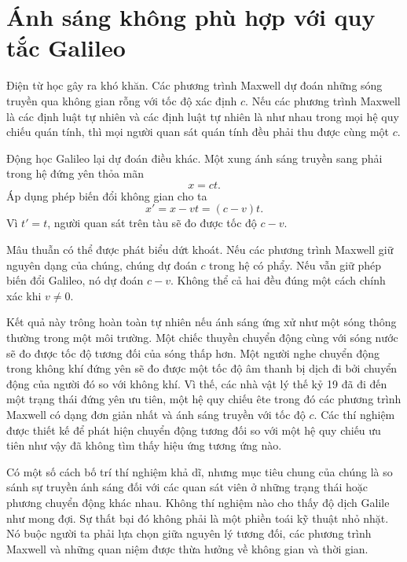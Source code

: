\section{Ánh sáng không phù hợp với quy tắc Galileo}

Điện từ học gây ra khó khăn. Các phương trình Maxwell dự đoán những sóng truyền qua không gian rỗng với tốc độ xác định \(c\). Nếu các phương trình Maxwell là các định luật tự nhiên và các định luật tự nhiên là như nhau trong mọi hệ quy chiếu quán tính, thì mọi người quan sát quán tính đều phải thu được cùng một \(c\).

Động học Galileo lại dự đoán điều khác. Một xung ánh sáng truyền sang phải trong hệ đứng yên thỏa mãn
\begin{equation}
x=ct.
\end{equation}
Áp dụng phép biến đổi không gian cho ta
\begin{equation}
x'=x-vt=(c-v)t.
\end{equation}
Vì \(t'=t\), người quan sát trên tàu sẽ đo được tốc độ \(c-v\).

Mâu thuẫn có thể được phát biểu dứt khoát. Nếu các phương trình Maxwell giữ nguyên dạng của chúng, chúng dự đoán \(c\) trong hệ có phẩy. Nếu vẫn giữ phép biến đổi Galileo, nó dự đoán \(c-v\). Không thể cả hai đều đúng một cách chính xác khi \(v\ne0\).

Kết quả này trông hoàn toàn tự nhiên nếu ánh sáng ứng xử như một sóng thông thường trong một môi trường. Một chiếc thuyền chuyển động cùng với sóng nước sẽ đo được tốc độ tương đối của sóng thấp hơn. Một người nghe chuyển động trong không khí đứng yên sẽ đo được một tốc độ âm thanh bị dịch đi bởi chuyển động của người đó so với không khí. Vì thế, các nhà vật lý thế kỷ 19 đã đi đến một trạng thái đứng yên ưu tiên, một hệ quy chiếu ête trong đó các phương trình Maxwell có dạng đơn giản nhất và ánh sáng truyền với tốc độ \(c\). Các thí nghiệm được thiết kế để phát hiện chuyển động tương đối so với một hệ quy chiếu ưu tiên như vậy đã không tìm thấy hiệu ứng tương ứng nào.

Có một số cách bố trí thí nghiệm khả dĩ, nhưng mục tiêu chung của chúng là so sánh sự truyền ánh sáng đối với các quan sát viên ở những trạng thái hoặc phương chuyển động khác nhau. Không thí nghiệm nào cho thấy độ dịch Galile như mong đợi. Sự thất bại đó không phải là một phiền toái kỹ thuật nhỏ nhặt. Nó buộc người ta phải lựa chọn giữa nguyên lý tương đối, các phương trình Maxwell và những quan niệm được thừa hưởng về không gian và thời gian.

